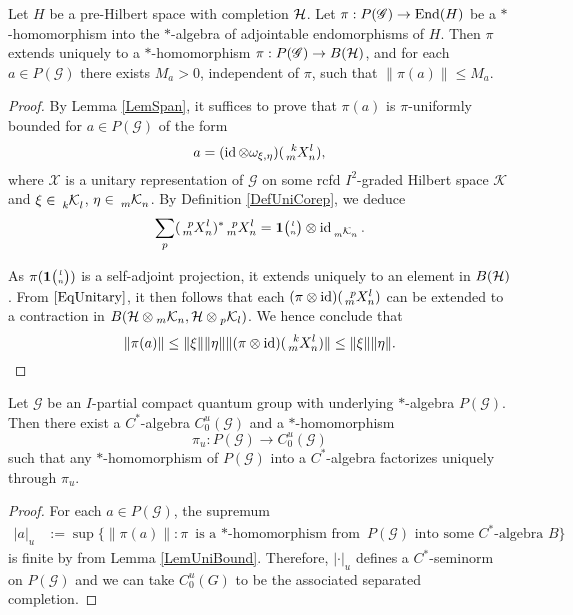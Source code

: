 \begin{Lem}\label{LemUniBound}
 Let $H$ be a pre-Hilbert space with completion $\Hsp$. Let $\pi: P(\mathscr{G})\rightarrow \End(H)$ be a $*$-homomorphism into the $*$-algebra of adjointable endomorphisms of $H$. Then $\pi$ extends uniquely to a $*$-homomorphism $\pi: P(\mathscr{G})\rightarrow B(\Hsp)$, and for each $a\in P(\mathscr{G})$ there exists $M_a>0$, independent of $\pi$, such that $\|\pi(a)\|\leq M_a$.
\end{Lem} 

\begin{proof}
By Lemma \ref{LemSpan}, it suffices to prove that $\pi(a)$ is $\pi$-uniformly bounded for $a\in P(\mathscr{G})$ of the form \[a=(\id \otimes \omega_{\xi,\eta})(\Gr{X}{k}{l}{m}{n}),\]
where $\mathscr{X}$ is a unitary representation of
$\mathscr{G}$ on some rcfd $I^{2}$-graded Hilbert space
$\mathcal{K}$ and $\xi\in \Gru{\mathcal{K}}{k}{l}$, $\eta\in
\Gru{\mathcal{K}}{m}{n}$.  By Definition \ref{DefUniCorep}, we deduce
  \begin{equation}\label{EqUnitary}
    \sum_{p}(\Gr{X}{p}{l}{m}{n})^{*} \Gr{X}{p}{l}{m}{n}  = \UnitC{l}{n}
    \otimes \id_{\Gru{\mathcal{K}}{m}{n}}.
  \end{equation}

As $\pi(\UnitC{l}{n})$ is a self-adjoint projection, it extends uniquely to an element in $B(\Hsp)$. From  $\eqref{EqUnitary}$, it then follows that each $(\pi\otimes \id)(\Gr{X}{p}{l}{m}{n})$ can be extended to a contraction in $B(\Hsp\otimes \GrDA{\mathcal{K}}{m}{n},\Hsp\otimes \GrDA{\mathcal{K}}{p}{l})$. We hence conclude that
 \[\|\pi(a)\| \leq \| \xi\| \|\eta\| \|(\pi \otimes \id)(\Gr{X}{k}{l}{m}{n})\| \leq
    \|\xi\|\|\eta\|. \qedhere \]  
\end{proof} 


\begin{Prop}
Let $\mathscr{G}$ be an $I$-partial compact quantum group with underlying
$*$-algebra $P(\mathscr{G})$. Then
  there exist a $C^{*}$-algebra $C^{u}_{0}(\mathscr{G})$ and a
  $*$-homomorphism \[\pi_{u} \colon P(\mathscr{G}) \to
  C^{u}_{0}(\mathscr{G}) \] such that any $*$-homomorphism of
  $P(\mathscr{G})$ into a $C^{*}$-algebra factorizes uniquely through
  $\pi_{u}$.
\end{Prop}
\begin{proof}
For each $a \in P(\mathscr{G})$, the supremum
\begin{align*} 
  |a|_{u}&:= \sup \{ \|\pi(a)\| : \pi \text{ is a $*$-homomorphism from } P(\mathscr{G})
  \text{ into some $C^{*}$-algebra } B\}
\end{align*}
is finite by from Lemma \ref{LemUniBound}. Therefore, $|\cdot |_{u}$ defines a $C^{*}$-seminorm on
$P(\mathscr{G})$ and we can take $C^{u}_{0}(G)$ to be the associated
separated completion. 
\end{proof}

